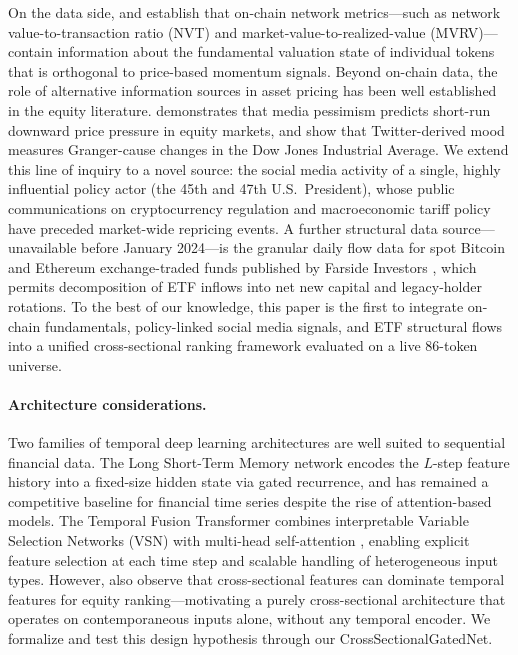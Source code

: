 On the data side, \citet{liu2022cryptocurrency} and \citet{cong2021tokenomics}
establish that on-chain network metrics—such as network value-to-transaction
ratio (NVT) and market-value-to-realized-value (MVRV)—contain information
about the fundamental valuation state of individual tokens that is orthogonal
to price-based momentum signals.
Beyond on-chain data, the role of alternative information sources in asset
pricing has been well established in the equity literature.
\citet{tetlock2007giving} demonstrates that media pessimism predicts short-run
downward price pressure in equity markets, and \citet{bollen2011twitter}
show that Twitter-derived mood measures Granger-cause changes in the Dow Jones
Industrial Average.
We extend this line of inquiry to a novel source: the social media activity of
a single, highly influential policy actor (the 45th and 47th U.S.\ President),
whose public communications on cryptocurrency regulation and macroeconomic
tariff policy have preceded market-wide repricing events.
A further structural data source—unavailable before January 2024—is the
granular daily flow data for spot Bitcoin and Ethereum exchange-traded funds
published by Farside Investors
\citep{bitcoin_etf_farside,ethereum_etf_farside}, which permits decomposition of ETF
inflows into net new capital and legacy-holder rotations.
To the best of our knowledge, this paper is the first to integrate on-chain fundamentals,
policy-linked social media signals, and ETF structural flows into a unified
cross-sectional ranking framework evaluated on a live 86-token universe.

\paragraph{Architecture considerations.}
Two families of temporal deep learning architectures are well suited to
sequential financial data.
The Long Short-Term Memory network \citep{hochreiter1997long} encodes the
$L$-step feature history into a fixed-size hidden state via gated recurrence,
and has remained a competitive baseline for financial time series despite the
rise of attention-based models.
The Temporal Fusion Transformer \citep{lim2021temporal} combines interpretable
Variable Selection Networks (VSN) with multi-head self-attention
\citep{vaswani2017attention}, enabling explicit feature selection at each
time step and scalable handling of heterogeneous input types.
However, \citet{gu2020empirical} also observe that cross-sectional features
can dominate temporal features for equity ranking—motivating a purely
cross-sectional architecture that operates on contemporaneous inputs alone,
without any temporal encoder.
We formalize and test this design hypothesis through our CrossSectionalGatedNet.

